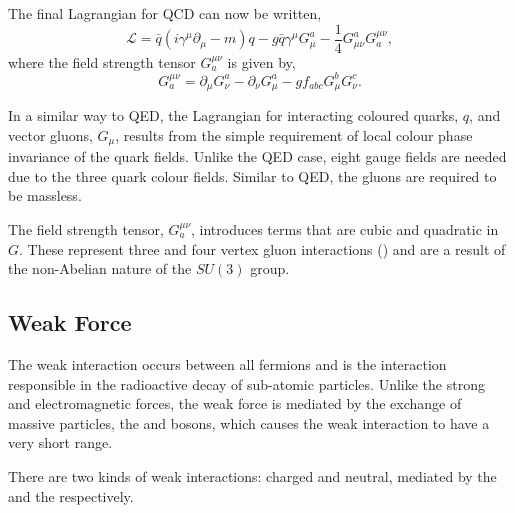 The final Lagrangian for QCD can now be written,
\begin{equation}
\mathcal{L} = 
\bar{q}(i\gamma^{\mu}\partial_{\mu} - m)q -
g \bar{q} \gamma^{\mu} G_{\mu}^{a} - 
\frac{1}{4} G_{\mu\nu}^{a} G^{\mu\nu}_{a},
\end{equation}
where the field strength tensor $G^{\mu\nu}_{a}$ is given by,
\begin{equation}
G^{\mu\nu}_{a} 
= \partial_{\mu} G^{a}_{\nu}
- \partial_{\nu} G^{a}_{\mu}
-g f_{abc} G^{b}_{\mu} G^{c}_{\nu}.
\end{equation}

In a similar way to QED, the Lagrangian for interacting coloured quarks, $q$, and
vector gluons, $G_{\mu}$, results from the simple requirement of local colour
phase invariance of the quark fields. Unlike the QED case, eight gauge fields
are needed due to the three quark colour fields.  Similar to QED, the gluons are
required to  be massless.

The field strength tensor, $G^{\mu\nu}_{a}$, introduces terms that are cubic and
quadratic in $G$. These represent three and four vertex gluon interactions
() and are a result of the non-Abelian nature of the
$SU(3)$ group.

\subsection{Weak Force}
The weak interaction occurs between all fermions and is the interaction
responsible in the radioactive decay of sub-atomic particles.  Unlike the strong
and electromagnetic forces, the weak force is mediated by the exchange of
massive particles, the \PWpm and \PZ bosons, which causes the weak interaction
to have a very short range.

There are two kinds of weak interactions: charged and neutral, mediated by the
\PW and the \PZ respectively.

